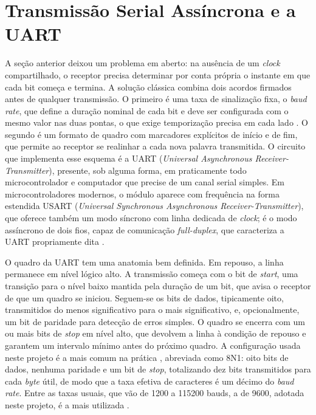 \documentclass[
	12pt,
	oneside,
	a4paper,
	english,
	french,
	spanish,
	brazil,
	]{abntex2}
\begin{document}
\section{Transmissão Serial Assíncrona e a UART}
\label{sec:transmissao_serial_assincrona}
A seção anterior deixou um problema em aberto: na ausência de um \emph{clock} compartilhado, o receptor precisa determinar por conta própria o instante em que cada bit começa e termina. A solução clássica combina dois acordos firmados antes de qualquer transmissão. O primeiro é uma taxa de sinalização fixa, o \emph{baud rate}, que define a duração nominal de cada bit e deve ser configurada com o mesmo valor nas duas pontas, o que exige temporização precisa em cada lado \cite{microchip_tb3216}. O segundo é um formato de quadro com marcadores explícitos de início e de fim, que permite ao receptor se realinhar a cada nova palavra transmitida. O circuito que implementa esse esquema é a UART (\emph{Universal Asynchronous Receiver-Transmitter}), presente, sob alguma forma, em praticamente todo microcontrolador e computador que precise de um canal serial simples. Em microcontroladores modernos, o módulo aparece com frequência na forma estendida USART (\emph{Universal Synchronous Asynchronous Receiver-Transmitter}), que oferece também um modo síncrono com linha dedicada de \emph{clock}; é o modo assíncrono de dois fios, capaz de comunicação \emph{full-duplex}, que caracteriza a UART propriamente dita \cite{microchip_tb3216}.

O quadro da UART tem uma anatomia bem definida. Em repouso, a linha permanece em nível lógico alto. A transmissão começa com o bit de \emph{start}, uma transição para o nível baixo mantida pela duração de um bit, que avisa o receptor de que um quadro se iniciou. Seguem-se os bits de dados, tipicamente oito, transmitidos do menos significativo para o mais significativo, e, opcionalmente, um bit de paridade para detecção de erros simples. O quadro se encerra com um ou mais bits de \emph{stop} em nível alto, que devolvem a linha à condição de repouso e garantem um intervalo mínimo antes do próximo quadro. A configuração usada neste projeto é a mais comum na prática \cite{microchip_tb3216}, abreviada como 8N1: oito bits de dados, nenhuma paridade e um bit de \emph{stop}, totalizando dez bits transmitidos para cada \emph{byte} útil, de modo que a taxa efetiva de caracteres é um décimo do \emph{baud rate}. Entre as taxas usuais, que vão de 1200 a 115200 bauds, a de 9600, adotada neste projeto, é a mais utilizada \cite{microchip_tb3216}.
\end{document}
